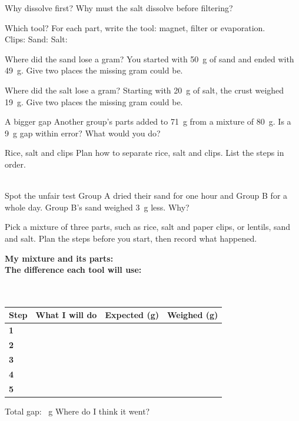\begin{puzzle}{Why dissolve first?}
Why must the salt dissolve before filtering? \wline[6cm]
\end{puzzle}

\begin{puzzle}{Which tool?}
For each part, write the tool: magnet, filter or evaporation.\\
Clips: \wline[3cm] \quad Sand: \wline[3cm] \quad Salt: \wline[3cm]
\end{puzzle}

\clearpage

\begin{puzzle}{Where did the sand lose a gram?}
You started with 50~g of sand and ended with 49~g. Give two places the missing gram could be. \wline[6cm]
\end{puzzle}

\begin{puzzle}{Where did the salt lose a gram?}
Starting with 20~g of salt, the crust weighed 19~g. Give two places the missing gram could be. \wline[6cm]
\end{puzzle}

\begin{puzzle}{A bigger gap}
Another group's parts added to 71~g from a mixture of 80~g. Is a 9~g gap within error? \wline[2cm] What would you do? \wline[4cm]
\end{puzzle}

\begin{puzzle}{Rice, salt and clips}
Plan how to separate rice, salt and clips. List the steps in order.\\
\wline[9cm]\\[8pt]\wline[9cm]
\end{puzzle}

\begin{puzzle}{Spot the unfair test}
Group A dried their sand for one hour and Group B for a whole day. Group B's sand weighed 3~g less. Why? \wline[6cm]
\end{puzzle}
\clearpage

\thispagestyle{fancy}
Pick a mixture of three parts, such as rice, salt and paper clips, or lentils, sand and salt. Plan the steps before you start, then record what happened.\par\medskip
\textbf{My mixture and its parts:} \wline[7cm]\\[10pt]
\textbf{The difference each tool will use:}\\[4pt]
\wline[9cm]\\[8pt]\wline[9cm]\\[8pt]
\renewcommand{\arraystretch}{2.6}
\begin{tabularx}{\linewidth}{|>{\sffamily\small\bfseries}p{1.6cm}|X|X|X|}
\hline
Step & What I will do & Expected (g) & Weighed (g) \\ \hline
1 & & & \\ \hline
2 & & & \\ \hline
3 & & & \\ \hline
4 & & & \\ \hline
5 & & & \\ \hline
\end{tabularx}

\vspace{8pt}
Total gap: \wline[2cm]~g \quad Where do I think it went? \wline[5cm]
\clearpage
